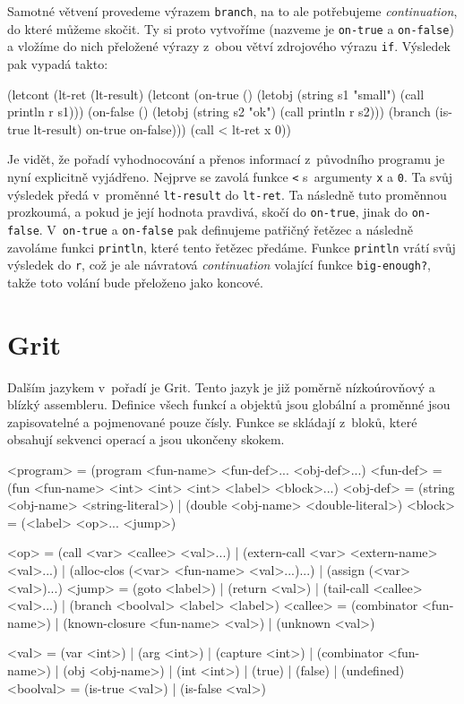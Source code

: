 Samotné větvení provedeme výrazem \texttt{branch}, na to ale potřebujeme
\emph{continuation}, do které můžeme skočit. Ty si proto vytvoříme (nazveme je 
\texttt{on-true} a \texttt{on-false}) a vložíme do nich přeložené výrazy z~obou
větví zdrojového výrazu \texttt{if}. Výsledek pak vypadá takto:

\begin{spine}
(letcont (lt-ret (lt-result)
            (letcont (on-true ()
                        (letobj (string s1 "small") (call println r s1)))
                     (on-false ()
                        (letobj (string s2 "ok") (call println r s2)))
              (branch (is-true lt-result) on-true on-false)))
  (call < lt-ret x 0))
\end{spine}

Je vidět, že pořadí vyhodnocování a přenos informací z~původního programu je
nyní explicitně vyjádřeno. Nejprve se zavolá funkce \texttt{<} s~argumenty
\texttt{x} a \texttt{0}. Ta svůj výsledek předá v~proměnné \texttt{lt-result} do
\texttt{lt-ret}. Ta následně tuto proměnnou prozkoumá, a pokud je její hodnota
pravdivá, skočí do \texttt{on-true}, jinak do \texttt{on-false}.
V~\texttt{on-true} a \texttt{on-false} pak definujeme patřičný řetězec a
následně zavoláme funkci \texttt{println}, které tento řetězec předáme. Funkce
\texttt{println} vrátí svůj výsledek do \texttt{r}, což je ale návratová
\emph{continuation} volající funkce \texttt{big-enough?}, takže toto volání bude
přeloženo jako koncové.

\section{Grit}

Dalším jazykem v~pořadí je Grit. Tento jazyk je již poměrně nízkoúrovňový a
blízký assembleru. Definice všech funkcí a objektů jsou globální a proměnné jsou
zapisovatelné a pojmenované pouze čísly. Funkce se skládají z~bloků, které
obsahují sekvenci operací a jsou ukončeny skokem.

\begin{gram}
<program>   = (program <fun-name> <fun-def>... <obj-def>...)
<fun-def>   = (fun <fun-name> <int> <int> <int> <label> <block>...)
<obj-def>   = (string <obj-name> <string-literal>)
            | (double <obj-name> <double-literal>)
<block>     = (<label> <op>... <jump>)

<op>        = (call <var> <callee> <val>...)
            | (extern-call <var> <extern-name> <val>...)
            | (alloc-clos (<var> <fun-name> <val>...)...)
            | (assign (<var> <val>)...)
<jump>      = (goto <label>)
            | (return <val>)
            | (tail-call <callee> <val>...)
            | (branch <boolval> <label> <label>)
<callee>    = (combinator <fun-name>)
            | (known-closure <fun-name> <val>)
            | (unknown <val>)

<val>       = (var <int>)
            | (arg <int>)
            | (capture <int>)
            | (combinator <fun-name>)
            | (obj <obj-name>)
            | (int <int>)
            | (true)
            | (false)
            | (undefined)
<boolval>   = (is-true <val>) | (is-false <val>)
\end{gram}

